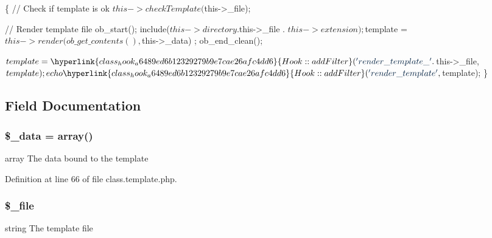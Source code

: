 \begin{DoxyCode}
                                      \{
                              \textcolor{comment}{// Check if template is ok}
                              $this->checkTemplate($this->\_file);

                              \textcolor{comment}{// Render template file}
                              ob\_start();
                              include($this->directory . $this->\_file . $this->
      extension);
                              $template = $this->render(ob\_get\_contents(), 
      $this->\_data) ;
                              ob\_end\_clean();

                              $template = \hyperlink{class_hook_a6489ed6b12329279b9e7cae26afc4dd6}{Hook::addFilter}(\textcolor{stringliteral}{'
      render\_template\_'} . $this->\_file, $template);
                              echo \hyperlink{class_hook_a6489ed6b12329279b9e7cae26afc4dd6}{Hook::addFilter}(\textcolor{stringliteral}{'
      render\_template'}, $template);
               \}
\end{DoxyCode}


\subsection{Field Documentation}
\hypertarget{class_template_a5a3006290f2de94fff2dd63ca739d15a}{
\subsubsection[{\$\-\_\-data}]{\setlength{\rightskip}{0pt plus 5cm}\$\-\_\-data = array()\hspace{0.3cm}{\ttfamily [protected]}}}\label{class_template_a5a3006290f2de94fff2dd63ca739d15a}
array The data bound to the template 

Definition at line 66 of file class.\-template.\-php.

\hypertarget{class_template_abddaf0b77086e2b7d920f5d1a9616889}{
\subsubsection[{\$\-\_\-file}]{\setlength{\rightskip}{0pt plus 5cm}\$\-\_\-file\hspace{0.3cm}{\ttfamily [protected]}}}\label{class_template_abddaf0b77086e2b7d920f5d1a9616889}
string The template file 

